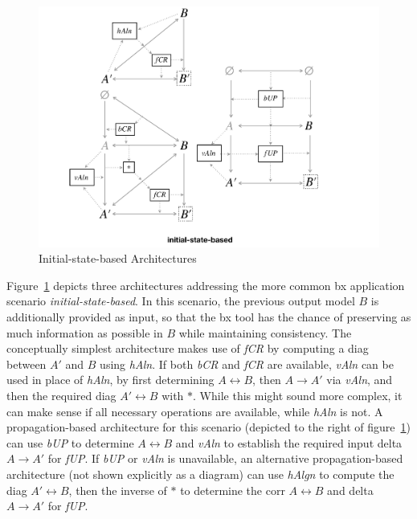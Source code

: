 \begin{figure}[b!]
	\centering
	\includegraphics[width=\columnwidth]{diagrams/foundations/initial-state-based}
	\caption{Initial-state-based Architectures}
	\label{fig:initialStateBased}
\end{figure}
%
Figure~\ref{fig:initialStateBased} depicts three architectures addressing the more common bx application scenario \emph{initial-state-based}.
In this scenario, the previous output model $B$ is additionally provided as input, so that the bx tool has the chance of preserving as much information as possible in $B$ while maintaining consistency.
%
The conceptually simplest architecture makes use of \emph{fCR} by computing a diag between $A'$ and $B$ using \emph{hAln}.
%
If both \emph{bCR} and \emph{fCR} are available, \emph{vAln} can be used in place of \emph{hAln}, by first determining $A \leftrightarrow B$, then $A \rightarrow A'$ via \emph{vAln}, and then the required diag $A' \leftrightarrow B$ with $\ast$.
While this might sound more complex, it can make sense if all necessary operations are available, while \emph{hAln} is not.
%
A propagation-based architecture for this scenario (depicted to the right of figure~\ref{fig:initialStateBased}) can use \emph{bUP} to determine $A \leftrightarrow B$ and \emph{vAln} to establish the required input delta $A \rightarrow A'$ for \emph{fUP}.
If \emph{bUP} or \emph{vAln} is unavailable, an alternative propagation-based architecture (not shown explicitly as a diagram) can use \emph{hAlgn} to compute the diag $A' \leftrightarrow B$, then the inverse of $\ast$ to determine the corr $A \leftrightarrow B$ and delta $A \rightarrow A'$ for \emph{fUP}. 

